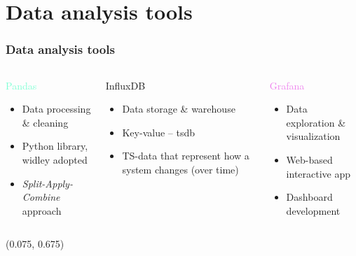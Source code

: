 \section{Data analysis tools}
\SectionPage

\begin{frame}
    \frametitle{Data analysis tools}
    \vspace*{\fill}
    \begin{columns}[onlytextwidth, t]
        \begin{column}{.33\textwidth}
            \centering
            \textcolor{Aquamarine}{\Large Pandas}
            \vspace{0.5cm}

            \begin{itemize}
                \item Data processing \& cleaning
                \item Python library, widley adopted
                \item \textit{Split-Apply-Combine} approach
            \end{itemize}
        \end{column}

        \begin{column}{.33\textwidth}
            \centering
            \textcolor{YellowOrange}{\Large InfluxDB}
            \vspace{0.5cm}

            \begin{itemize}
                \item Data storage \& warehouse
                \item Key-value -- \acl{tsdb}
                \item TS-data that represent how a system changes (over time)
            \end{itemize}
        \end{column}

        \begin{column}{.33\textwidth}
            \centering
            \textcolor{violet}{\Large Grafana}
            \vspace{0.5cm}

            \begin{itemize}
                \item Data exploration \& visualization
                \item Web-based interactive app
                \item Dashboard development
            \end{itemize}
        \end{column}
    \end{columns}

    \begin{textblock}{1}(0.075, 0.675)
    \end{textblock}

    \vspace*{\fill}
\end{frame}